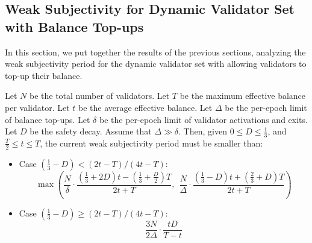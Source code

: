\subsection{Weak Subjectivity for Dynamic Validator Set with Balance Top-ups}

In this section, we put together the results of the previous sections, analyzing the weak subjectivity period for the dynamic validator set with allowing validators to top-up their balance.

\begin{theorem}\label{thm:weak-subjectivity-balance-top-ups}
Let $N$ be the total number of validators.
Let $T$ be the maximum effective balance per validator.
Let $t$ be the average effective balance.
Let $\Delta$ be the per-epoch limit of balance top-ups.
Let $\delta$ be the per-epoch limit of validator activations and exits.
Let $D$ be the safety decay.
%
Assume that $\Delta \gg \delta$.
Then, given $0 \le D \le \frac{1}{3}$, and $\frac{T}{2} \le t \le T$, the current weak subjectivity period must be smaller than:
\begin{itemize}
\item Case $(\frac{1}{3} - D) < (2t - T)/(4t - T)$:
\[
\max\left(
\frac{N}{\delta} \cdot \frac{(\frac{1}{3} + 2D)t - (\frac{1}{3} + \frac{D}{2})T}{2t+T},~~
\frac{N}{\Delta} \cdot \frac{(\frac{1}{3} - D)t + (\frac{2}{3} + D)T}{2t+T}
\right)
\]
\item Case $(\frac{1}{3} - D) \ge (2t - T)/(4t - T)$:
\[
\frac{3N}{2\Delta} \cdot \frac{tD}{T-t}
\]
\end{itemize}
\end{theorem}
